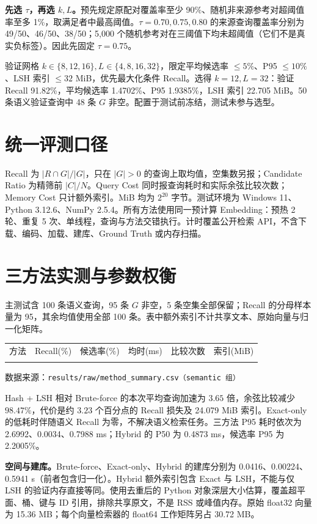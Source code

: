 \documentclass[UTF8,fontset=fandol,a4paper,10pt]{ctexart}
\newcommand{\toprule}{\hline\noalign{\vskip 3pt}}
\newcommand{\midrule}{\noalign{\vskip 3pt}\hline\noalign{\vskip 3pt}}
\newcommand{\src}[1]{{\footnotesize\noindent 数据来源：\texttt{#1}\par}}
\begin{document}
\textbf{先选 $\tau$，再选 $k,L$。}预先规定原配对覆盖率至少 90\%、随机非来源参考对超阈值率至多 1\%，取满足者中最高阈值。$\tau=0.70,0.75,0.80$ 的来源查询覆盖率分别为 49/50、46/50、38/50；5,000 个随机参考对在三阈值下均未超阈值（它们不是真实负标签）。因此先固定 $\tau=0.75$。

验证网格 $k\in\{8,12,16\},L\in\{4,8,16,32\}$，限定平均候选率 $\le5\%$、P95 $\le10\%$、LSH 索引 $\le32$ MiB，优先最大化条件 Recall。选得 $k=12,L=32$：验证 Recall 91.82\%，平均候选率 1.4702\%、P95 1.9385\%，LSH 索引 22.705 MiB。50 条语义验证查询中 48 条 $G$ 非空。配置于测试前冻结，测试未参与选型。

\section{统一评测口径}
Recall 为 $|R\cap G|/|G|$，只在 $|G|>0$ 的查询上取均值，空集数另报；Candidate Ratio 为精筛前 $|C|/N$。Query Cost 同时报查询耗时和实际余弦比较次数；Memory Cost 只计额外索引。MiB 均为 $2^{20}$ 字节。测试环境为 Windows 11、Python 3.12.6、NumPy 2.5.4。所有方法使用同一预计算 Embedding：预热 2 轮、重复 5 次、单线程，查询与方法交错执行。计时覆盖公开检索 API，不含下载、编码、加载、建库、Ground Truth 或内存扫描。

\newpage
\section{三方法实测与参数权衡}
主测试含 100 条语义查询，95 条 $G$ 非空，5 条空集全部保留；Recall 的分母样本量为 95，其余均值使用全部 100 条。表中额外索引不计共享文本、原始向量与归一化矩阵。
\begin{center}\small
\begin{tabular}{lrrrrr}\toprule
方法 & Recall(\%) & 候选率(\%) & 均时(ms) & 比较次数 & 索引(MiB)\\\midrule

\end{tabular}
\end{center}
\src{results/raw/method\_summary.csv（semantic 组）}
Hash + LSH 相对 Brute-force 的本次平均查询加速为 $3.65$ 倍，余弦比较减少 $98.47\%$，代价是约 $3.23$ 个百分点的 Recall 损失及 24.079 MiB 索引。Exact-only 的低耗时伴随语义 Recall 为零，不解决语义检索任务。三方法 P95 耗时依次为 2.6992、0.0034、0.7988 ms；Hybrid 的 P50 为 0.4873 ms，候选率 P95 为 2.2005\%。

\textbf{空间与建库。}Brute-force、Exact-only、Hybrid 的建库分别为 0.0416、0.00224、0.5941 s（前者包含归一化）。Hybrid 额外索引包含 Exact 与 LSH，不能与仅 LSH 的验证内存直接等同。使用去重后的 Python 对象深层大小估算，覆盖超平面、桶、键与 ID 引用，排除共享原文，不是 RSS 或峰值内存。原始 float32 向量为 15.36 MB；每个向量检索器的 float64 工作矩阵另占 30.72 MB。
\end{document}
